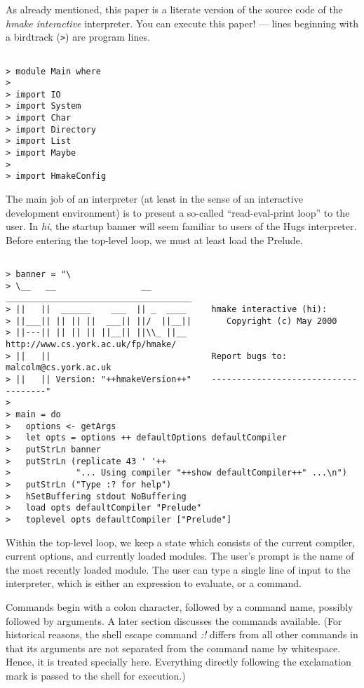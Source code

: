 \documentclass[a4paper]{article}
\begin{document}
As already mentioned, this paper is a literate version of the
source code of the {\em hmake interactive} interpreter.  You can
execute this paper! --- lines beginning with a birdtrack ({\tt >})
are program lines.

\begin{verbatim}

> module Main where
> 
> import IO
> import System
> import Char
> import Directory
> import List
> import Maybe
> 
> import HmakeConfig

\end{verbatim}

The main job of an interpreter (at least in the sense of an interactive
development environment) is to present a so-called ``read-eval-print
loop'' to the user.  In {\em hi}, the startup banner will seem familiar
to users of the Hugs interpreter.  Before entering the top-level loop,
we must at least load the Prelude.

\begin{verbatim}

> banner = "\ 
> \__   __                 __             _____________________________________
> ||   ||  ______    ___  || _  ____     hmake interactive (hi):
> ||___|| || || ||  ___|| ||/  ||__||       Copyright (c) May 2000
> ||---|| || || || ||__|| ||\\_ ||__         http://www.cs.york.ac.uk/fp/hmake/
> ||   ||                                Report bugs to: malcolm@cs.york.ac.uk
> ||   || Version: "++hmakeVersion++"    -------------------------------------"
>
> main = do
>   options <- getArgs
>   let opts = options ++ defaultOptions defaultCompiler
>   putStrLn banner
>   putStrLn (replicate 43 ' '++
>             "... Using compiler "++show defaultCompiler++" ...\n")
>   putStrLn ("Type :? for help")
>   hSetBuffering stdout NoBuffering
>   load opts defaultCompiler "Prelude"
>   toplevel opts defaultCompiler ["Prelude"]

\end{verbatim}

Within the top-level loop, we keep a state which consists of the
current compiler, current options, and currently loaded modules.
The user's prompt is the name of the most recently loaded module.
The user can type a single line of input to the interpreter, which
is either an expression to evaluate, or a command.

Commands begin with a colon character, followed by a command name,
possibly followed by arguments.  A later section discusses the commands
available.  (For historical reasons, the shell escape command {\em :!}
differs from all other commands in that its arguments are not separated
from the command name by whitespace.  Hence, it is treated specially
here.  Everything directly following the exclamation mark is passed
to the shell for execution.)
\end{document}
